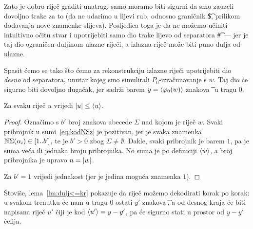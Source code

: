 Zato je dobro riječ graditi unatrag, samo moramo biti sigurni da smo zauzeli dovoljno trake za to (da ne udarimo u lijevi rub, odnosno graničnik \t\$, prilikom dodavanja nove znamenke slijeva). Posljedica toga je da ne možemo učiniti intuitivno očitu stvar i upotrijebiti samo dio trake lijevo od separatora \t\#\ ---  jer je taj dio ograničen duljinom ulazne riječi, a izlazna riječ može biti puno dulja od ulazne.

Spasit ćemo se tako što ćemo za rekonstrukciju izlazne riječi upotrijebiti dio \emph{desno} od separatora, unutar kojeg smo simulirali $P_0$-izračunavanje s $w$. Taj dio će sigurno biti dovoljno dugačak, jer sadrži barem $y=\langle\varphi_0(w)\rangle$ znakova \t\textbullet\ u tragu $0$.

\begin{lema}[{name=[duljina riječi nije veća od koda riječi]}]\label{lm:dulj<=kr}
Za svaku riječ $u$ vrijedi $\lvert u\rvert\le\langle u\rangle$.
\end{lema}
\begin{proof}
Označimo s $b'$ broj znakova abecede $\Sigma$ nad kojom je riječ $w$.
Svaki pribrojnik u sumi~\eqref{eq:kodNSz} je pozitivan, jer je svaka znamenka ${\mathbb N}\Sigma(\alpha_i)\in[1..b']$, te je $b'>0$ zbog $\Sigma\not=\emptyset$. Dakle, svaki pribrojnik je barem $1$, pa je suma veća ili jednaka broju pribrojnika. No suma je po definiciji $\langle w\rangle$, a broj pribrojnika je upravo $n=\lvert w\rvert$.

Za $b'=1$ vrijedi jednakost (jer je jedina moguća znamenka $1$).
\end{proof}

Štoviše, lema~\ref{lm:dulj<=kr} pokazuje da riječ možemo dekodirati korak po korak: u svakom trenutku će nam u tragu $0$ ostati $y'$ znakova \t\textbullet, a od desnog kraja će biti napisana riječ $u'$ čiji je kod $\langle u'\rangle=y-y'$, pa će sigurno stati u prostor od $y-y'$ ćelija.

